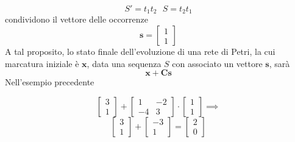 \documentclass[10pt, letterpaper]{report}
\begin{document}
$$ S'=t_1t_2 \ \ \ S=t_2t_1$$ 
condividono il vettore delle occorrenze 
$$ \mathbf s = \begin{bmatrix}
    1\\1
\end{bmatrix}$$
A tal proposito, lo stato finale dell'evoluzione di una rete di Petri, la cui marcatura iniziale è $\mathbf x$, data una sequenza $S$ con associato un vettore $\mathbf s$, sarà
$$ \mathbf x + \mathbf C \mathbf s$$
Nell'esempio precedente 

$$ \begin{bmatrix}
    3 \\ 1 
\end{bmatrix}+\begin{bmatrix}
1&-2\\-4&3
\end{bmatrix}\cdot \begin{bmatrix}
    1 \\ 1 
\end{bmatrix}\implies $$
$$ \begin{bmatrix}
    3 \\ 1 
\end{bmatrix}+\begin{bmatrix}
    -3 \\ 1 
\end{bmatrix}=\begin{bmatrix}
    2\\ 0
\end{bmatrix}$$
\flowerLine 
\end{document}
